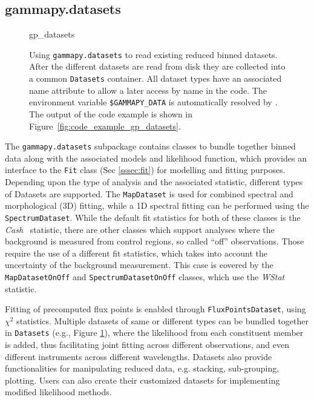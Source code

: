 \documentclass[longauth]{aa}
\newcommand{\code}[1]{\texttt{#1}}
\begin{document}
\subsection{gammapy.datasets}
\label{ssec:gammapy-datasets}
%
\begin{figure}
	\small
	{gp_datasets}
	\caption{
        Using \code{gammapy.datasets} to read existing reduced binned datasets.
        After the different datasets are read from disk they are collected into a
        common \code{Datasets} container. All dataset types have an associated
        name attribute to allow a later access by name in the code. The
        environment variable \code{\$GAMMAPY\_DATA} is automatically resolved
        by \gammapy. The output
		of the code example is shown in Figure~\ref{fig:code_example_gp_datasets}.
    }
	\label{fig*:minted:gp_datasets}
\end{figure}
%
The \code{gammapy.datasets} subpackage contains classes to bundle
together binned data along with the associated models and likelihood function, which
provides an interface to the \code{Fit} class (Sec \ref{sssec:fit}) for
modelling and fitting purposes. Depending upon the type of analysis and the
associated statistic, different types of Datasets are supported. The \code{MapDataset} is
used for combined spectral and morphological (3D) fitting, while a 1D spectral 
fitting can be performed using the \code{SpectrumDataset}.
While the default fit statistics for both of these classes is the \emph{Cash}~\citep{Cash}
statistic, there are other classes which support
analyses where the background is measured from control regions, so called \enquote{off} observations.
Those require the use of a different fit statistics, which takes into account the
uncertainty of the background measurement. This case is covered by the \code{MapDatasetOnOff}
and \code{SpectrumDatasetOnOff} classes, which use the \emph{WStat}~\citep{WStat} statistic.

Fitting of precomputed flux points is enabled through \code{FluxPointsDataset},
using \emph{$\chi^2$} statistics. Multiple datasets of same or different types can be
bundled together in \code{Datasets} (e.g., Figure \ref{fig*:minted:gp_datasets}),
where the likelihood from each constituent member is added, thus facilitating
joint fitting across different observations, and even different instruments
across different wavelengths. Datasets also provide functionalities for
manipulating reduced data, e.g. stacking, sub-grouping, plotting. Users can
also create their customized datasets for implementing modified likelihood
methods.
\end{document}
